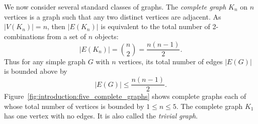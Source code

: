 We now consider several standard classes of graphs. The
\emph{complete graph} $K_n$ on $n$
vertices is a graph such that any two distinct vertices are
adjacent. As $|V(K_n)| = n$, then $|E(K_n)|$ is equivalent to the
total number of 2-combinations from a set of $n$ objects:
\begin{equation}
\label{eqn:introduction:size_of_K_n}
|E(K_n)|
=
\binom{n}{2}
=
\frac{n(n-1)}{2}.
\end{equation}
Thus for any simple graph $G$ with $n$ vertices, its total number of
edges $|E(G)|$ is bounded above by
\begin{equation}
\label{eqn:introduction:upper_bound_total_edges_simple_graph}
|E(G)|
\leq
\frac{n(n - 1)}{2}.
\end{equation}
Figure~\ref{fig:introduction:five_complete_graphs} shows complete
graphs each of whose total number of vertices is bounded by
$1 \leq n \leq 5$. The complete graph $K_1$ has one vertex with
no edges. It is also called the
\emph{trivial graph}.


